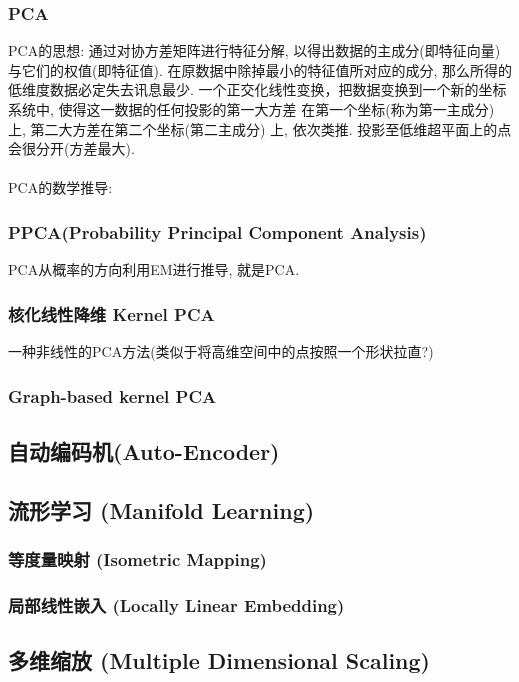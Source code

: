 \documentclass[oneside]{book}
\begin{document}
					\subsubsection{PCA \NovaMonoFont{[Linear]}}
					PCA的思想: 通过对协方差矩阵进行特征分解, 以得出数据的主成分(即特征向量) 与它们的权值(即特征值).
					在原数据中除掉最小的特征值所对应的成分, 那么所得的低维度数据必定失去讯息最少.
					一个正交化线性变换，把数据变换到一个新的坐标系统中, 使得这一数据的任何投影的第一大方差
					在第一个坐标(称为第一主成分) 上, 第二大方差在第二个坐标(第二主成分) 上, 依次类推.
					投影至低维超平面上的点会很分开(方差最大).\\ \\
					PCA的数学推导:\\
					\subsubsection{PPCA(Probability Principal Component Analysis) \NovaMonoFont{[Linear]}}
					PCA从概率的方向利用EM进行推导, 就是PCA. 
					\subsubsection{核化线性降维 Kernel PCA \NovaMonoFont{[Nonlinear]}}
					一种非线性的PCA方法(类似于将高维空间中的点按照一个形状拉直?)
					\subsubsection{Graph-based kernel PCA \NovaMonoFont{[Nonlinear]}}
					
				
				\subsection{自动编码机(Auto-Encoder)}
				\subsection{流形学习 (Manifold Learning) }
					\subsubsection{等度量映射 (Isometric Mapping)  \NovaMonoFont{[Nonlinear]}}
					\subsubsection{局部线性嵌入 (Locally Linear Embedding)  \NovaMonoFont{[Linear]}}
			\subsection{多维缩放 (Multiple Dimensional Scaling)}
\end{document}
